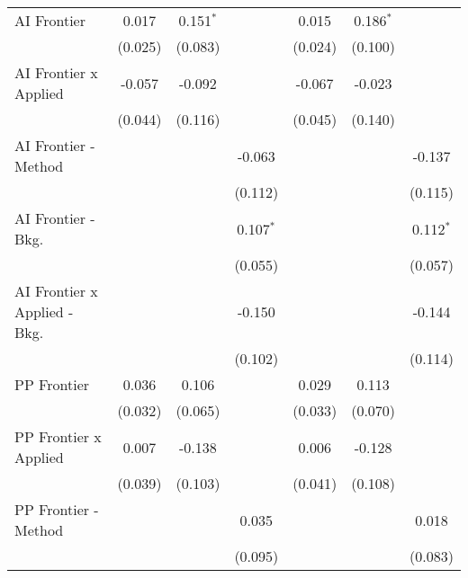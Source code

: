 \begin{tabular}{lcccccc}
   AI Frontier                    & 0.017        & 0.151$^{*}$ &                & 0.015          & 0.186$^{*}$ &   \\   
                                  & (0.025)      & (0.083)     &                & (0.024)        & (0.100)     &   \\   
   AI Frontier x Applied          & -0.057       & -0.092      &                & -0.067         & -0.023      &   \\   
                                  & (0.044)      & (0.116)     &                & (0.045)        & (0.140)     &   \\   
   AI Frontier - Method           &              &             & -0.063         &                &             & -0.137\\   
                                  &              &             & (0.112)        &                &             & (0.115)\\   
   AI Frontier - Bkg.             &              &             & 0.107$^{*}$    &                &             & 0.112$^{*}$\\   
                                  &              &             & (0.055)        &                &             & (0.057)\\   
   AI Frontier x Applied - Bkg.   &              &             & -0.150         &                &             & -0.144\\   
                                  &              &             & (0.102)        &                &             & (0.114)\\   
   PP Frontier                    & 0.036        & 0.106       &                & 0.029          & 0.113       &   \\   
                                  & (0.032)      & (0.065)     &                & (0.033)        & (0.070)     &   \\   
   PP Frontier x Applied          & 0.007        & -0.138      &                & 0.006          & -0.128      &   \\   
                                  & (0.039)      & (0.103)     &                & (0.041)        & (0.108)     &   \\   
   PP Frontier - Method           &              &             & 0.035          &                &             & 0.018\\   
                                  &              &             & (0.095)        &                &             & (0.083)\\   

\end{tabular}
